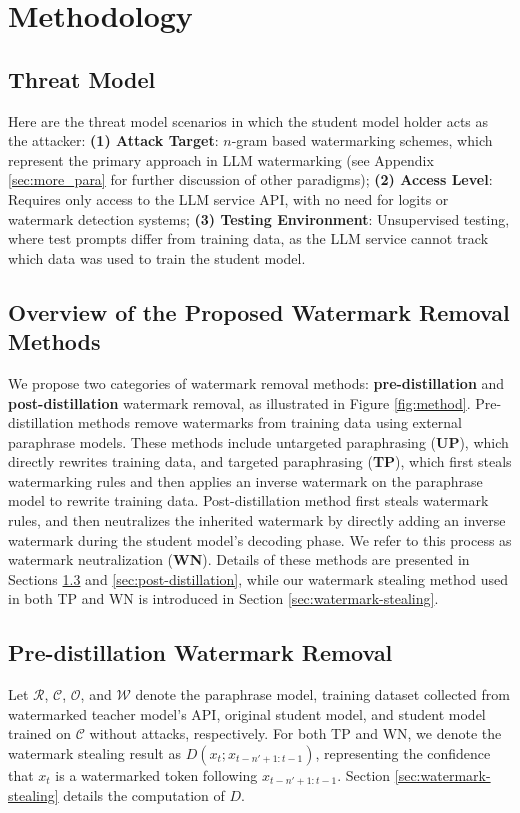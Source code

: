\section{Methodology}
\label{sec:method}
\subsection{Threat Model}
Here are the threat model scenarios in which the student model holder acts as the attacker: \textbf{(1) Attack Target}: $n$-gram based watermarking schemes, which represent the primary approach in LLM watermarking (see Appendix \ref{sec:more_para} for further discussion of other paradigms); \textbf{(2) Access Level}: Requires only access to the LLM service API, with no need for logits or watermark detection systems; \textbf{(3) Testing Environment}: Unsupervised testing, where test prompts differ from training data, as the LLM service cannot track which data was used to train the student model.

\subsection{Overview of the Proposed Watermark Removal Methods}
We propose two categories of watermark removal methods: \textbf{pre-distillation} and \textbf{post-distillation} watermark removal, as illustrated in Figure \ref{fig:method}. Pre-distillation methods remove watermarks from training data using external paraphrase models. These methods include untargeted paraphrasing (\textbf{UP}), which directly rewrites training data, and targeted paraphrasing (\textbf{TP}), which first steals watermarking rules and then applies an inverse watermark on the paraphrase model to rewrite training data. Post-distillation method first steals watermark rules, and then neutralizes the inherited watermark by directly adding an inverse watermark during the student model's decoding phase. We refer to this process as watermark neutralization (\textbf{WN}). Details of these methods are presented in Sections \ref{sec:pre-distillation} and \ref{sec:post-distillation}, while our watermark stealing method used in both TP and WN is introduced in Section \ref{sec:watermark-stealing}.

\vspace{-3pt}

\subsection{Pre-distillation Watermark Removal} 
\label{sec:pre-distillation}
Let $\mathcal{R}$, $\mathcal{C}$, $\mathcal{O}$, and $\mathcal{W}$ denote the paraphrase model, training dataset collected from watermarked teacher model's API, original student model, and student model trained on $\mathcal{C}$ without attacks, respectively. For both TP and WN, we denote the watermark stealing result as $D(x_t; x_{t-n'+1:t-1})$, representing the confidence that $x_t$ is a watermarked token following $x_{t-n'+1:t-1}$. Section \ref{sec:watermark-stealing} details the computation of $D$.

